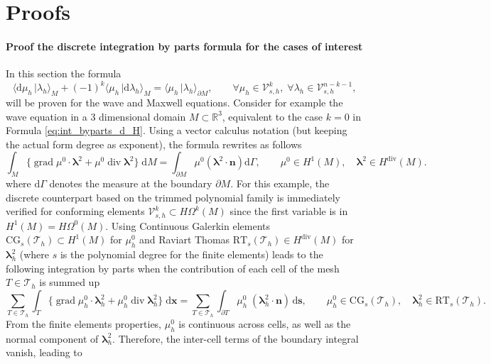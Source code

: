 \documentclass{elsarticle}
\newcommand{\revTwo}[1]{{\color{black}#1}}
\renewcommand\d{\ensuremath{\mathrm{d}}}
\newcommand{\bbR}{\mathbb{R}}
\newcommand{\dualpr}[3][]{\ensuremath{\langle #2 \, \vert #3 \rangle_{#1}}}
\DeclareMathOperator*{\grad}{grad}
\renewcommand{\div}{\operatorname{div}}
\begin{document}
\section{Proofs}\label{app:proofs}
\revTwo{
\paragraph{Proof the discrete integration by parts formula for the cases of interest}
In this section the formula
\begin{equation*}
    \dualpr[M]{\d\mu_h}{\lambda_h} + (-1)^k\dualpr[M]{\mu_h}{\d\lambda_h} = \dualpr[\partial M ]{\mu_h}{\lambda_h}, \qquad  \forall \mu_h \in \mathcal{V}_{s,h}^k, \; \forall\lambda_h \in \mathcal{V}_{s,h}^{n-k-1},
\end{equation*}
will be proven for the wave and Maxwell equations. Consider for example the wave equation in a 3 dimensional domain $M \subset \bbR^3$, equivalent to the case  $k=0$ in Formula \eqref{eq:int_byparts_d_H}. Using a vector calculus notation (but keeping the actual form degree as exponent), the formula rewrites as follows
\begin{equation*}
    \int_M \{  \grad \mu^0 \cdot \bm{\lambda}^2 + \mu^0 \div \bm{\lambda}^2 \} \; \d M = \int_{\partial M} \mu^0 (\bm{\lambda}^2 \cdot \bm{n}) \d{\Gamma}, \qquad \mu^0 \in H^1(M), \quad \bm{\lambda}^2 \in H^{\div}(M).
\end{equation*}
where $\d\Gamma$ denotes the measure at the boundary $\partial M$. For this example, the discrete counterpart based on the trimmed polynomial family is immediately verified for conforming elements $\mathcal{V}_{s, h}^k \subset H\Omega^k(M)$ since the first variable is in $H^1(M) = H\Omega^0(M)$. Using Continuous Galerkin elements $\mathrm{CG}_s(\mathcal{T}_h) \subset H^1(M)$  for $\mu^0_h$  and Raviart Thomas $\mathrm{RT}_s(\mathcal{T}_h) \in H^{\div}(M)$ for $\bm{\lambda}_h^2$ (where $s$ is the polynomial degree for the finite elements) leads to the following integration by parts when the contribution of each cell of the mesh $T \in \mathcal{T}_h$ is summed up
\begin{equation*}
    \sum_{T \in \mathcal{T}_h}\int_T \{\grad \mu^0_h \cdot \bm{\lambda}^2_h + \mu^0_h \div \bm{\lambda}^2_h\} \;  \d\bm{x} = \sum_{T \in \mathcal{T}_h} \int_{\partial T} \mu^0_h \; (\bm{\lambda}^2_h \cdot \bm{n}) \, \d\bm{s}, \qquad \mu^0_h \in \mathrm{CG}_s(\mathcal{T}_h), \quad \bm{\lambda}^2_h \in \mathrm{RT}_s(\mathcal{T}_h).
\end{equation*}
From the finite elements properties, $\mu^0_h$ is continuous across cells, as well as the normal component of $\bm{\lambda}^2_h$. Therefore, the inter-cell terms of the boundary integral vanish, leading to
}
\end{document}
